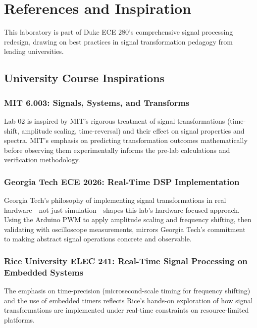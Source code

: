 \documentclass[11pt,letterpaper]{article}
\begin{document}
\clearpage

\section*{References and Inspiration}

This laboratory is part of Duke ECE 280's comprehensive signal processing redesign, drawing on best practices in signal transformation pedagogy from leading universities.

\subsection*{University Course Inspirations}

\subsubsection*{MIT 6.003: Signals, Systems, and Transforms}

Lab 02 is inspired by MIT's rigorous treatment of signal transformations (time-shift, amplitude scaling, time-reversal) and their effect on signal properties and spectra. MIT's emphasis on predicting transformation outcomes mathematically before observing them experimentally informs the pre-lab calculations and verification methodology.

\subsubsection*{Georgia Tech ECE 2026: Real-Time DSP Implementation}

Georgia Tech's philosophy of implementing signal transformations in real hardware—not just simulation—shapes this lab's hardware-focused approach. Using the Arduino PWM to apply amplitude scaling and frequency shifting, then validating with oscilloscope measurements, mirrors Georgia Tech's commitment to making abstract signal operations concrete and observable.

\subsubsection*{Rice University ELEC 241: Real-Time Signal Processing on Embedded Systems}

The emphasis on time-precision (microsecond-scale timing for frequency shifting) and the use of embedded timers reflects Rice's hands-on exploration of how signal transformations are implemented under real-time constraints on resource-limited platforms.
\end{document}
